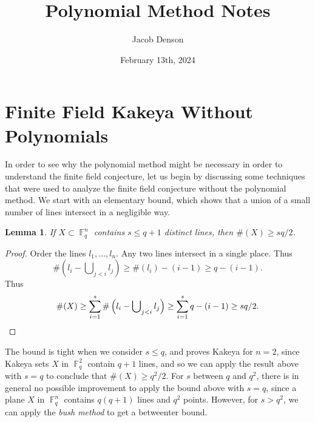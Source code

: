 \documentclass{article}
\title{Polynomial Method Notes}
\author{Jacob Denson}
\date{February 13th, 2024}
\DeclareMathOperator{\FF}{\mathbb{F}}
\theoremstyle{plain}
\newtheorem{lemma}[theorem]{Lemma}
\theoremstyle{definition}
\begin{document}
\maketitle

\section{Finite Field Kakeya Without Polynomials}

In order to see why the polynomial method might be necessary in order to understand the finite field conjecture, let us begin by discussing some techniques that were used to analyze the finite field conjecture without the polynomial method. We start with an elementary bound, which shows that a union of a small number of lines intersect in a negligible way.

\begin{lemma}
    If $X \subset \FF_q^n$ contains $s \leq q + 1$ distinct lines, then $\#(X) \geq sq/2$.
\end{lemma}
\begin{proof}
    Order the lines $l_1, \dots, l_n$. Any two lines intersect in a single place. Thus
    \[ \# \left( l_i - \bigcup\nolimits_{j < i} l_j \right) \geq \#(l_i) - (i-1) \geq q - (i-1). \]
    Thus
    \[ \#(X) \geq \sum_{i = 1}^s \# \left( l_i - \bigcup\nolimits_{j < i} l_j \right) \geq \sum_{i = 1}^s q - (i - 1) \geq sq/2 \qedhere. \]
\end{proof}

The bound is tight when we consider $s \leq q$, and proves Kakeya for $n = 2$, since Kakeya sets $X$ in $\FF_q^2$ contain $q+1$ lines, and so we can apply the result above with $s = q$ to conclude that $\#(X) \geq q^2/2$. For $s$ between $q$ and $q^2$, there is in general no possible improvement to apply the bound above with $s = q$, since a plane $X$ in $\FF_q^n$ contains $q(q+1)$ lines and $q^2$ points. However, for $s > q^2$, we can apply the \emph{bush method} to get a betweenter bound.
\end{document}

